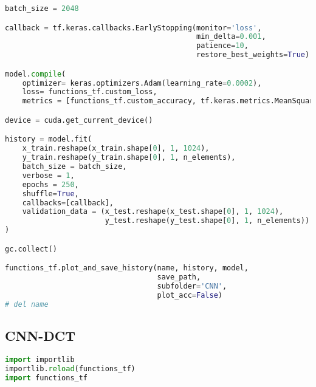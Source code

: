 \begin{lstlisting}[language=Python]
batch_size = 2048

callback = tf.keras.callbacks.EarlyStopping(monitor='loss',
                                            min_delta=0.001,
                                            patience=10,
                                            restore_best_weights=True)

model.compile(
    optimizer= keras.optimizers.Adam(learning_rate=0.0002),
    loss= functions_tf.custom_loss,
    metrics = [functions_tf.custom_accuracy, tf.keras.metrics.MeanSquaredError()])

device = cuda.get_current_device()

history = model.fit(
    x_train.reshape(x_train.shape[0], 1, 1024),
    y_train.reshape(y_train.shape[0], 1, n_elements),
    batch_size = batch_size,
    verbose = 1,
    epochs = 250,
    shuffle=True,
    callbacks=[callback],
    validation_data = (x_test.reshape(x_test.shape[0], 1, 1024), 
                       y_test.reshape(y_test.shape[0], 1, n_elements))
)

gc.collect()

functions_tf.plot_and_save_history(name, history, model, 
                                   save_path,
                                   subfolder='CNN',
                                   plot_acc=False)
# del name
\end{lstlisting}

\hypertarget{cnn-dct}{%
\subsection*{CNN-DCT}\label{cnn-dct}}

\begin{lstlisting}[language=Python]
import importlib
importlib.reload(functions_tf)
import functions_tf
\end{lstlisting}

